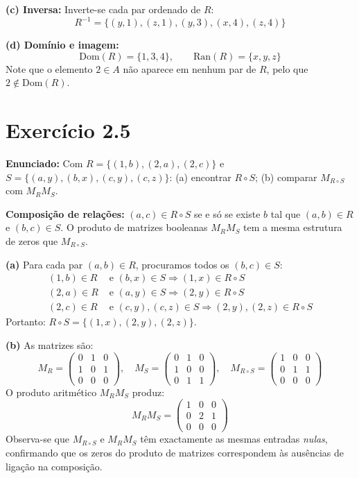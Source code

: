 \documentclass[12pt,a4paper]{article}
\begin{document}
\textbf{(c) Inversa:} Inverte-se cada par ordenado de $R$:
\[
R^{-1} = \{(y,1),(z,1),(y,3),(x,4),(z,4)\}
\]

\textbf{(d) Domínio e imagem:}
\[
\text{Dom}(R) = \{1, 3, 4\}, \qquad \text{Ran}(R) = \{x, y, z\}
\]
Note que o elemento $2 \in A$ não aparece em nenhum par de $R$, pelo que $2 \notin \text{Dom}(R)$.

\section*{Exercício 2.5}

\textbf{Enunciado:} Com $R = \{(1,b),(2,a),(2,c)\}$ e $S = \{(a,y),(b,x),(c,y),(c,z)\}$: (a) encontrar $R \circ S$; (b) comparar $M_{R \circ S}$ com $M_R M_S$.

\begin{teoribox}
\textbf{Composição de relações:} $(a,c) \in R \circ S$ se e só se existe $b$ tal que $(a,b) \in R$ e $(b,c) \in S$. O produto de matrizes booleanas $M_R M_S$ tem a mesma estrutura de zeros que $M_{R \circ S}$.
\end{teoribox}

\textbf{(a)} Para cada par $(a,b) \in R$, procuramos todos os $(b,c) \in S$:
\begin{align*}
(1,b) \in R &\text{ e } (b,x) \in S \Rightarrow (1,x) \in R \circ S \\
(2,a) \in R &\text{ e } (a,y) \in S \Rightarrow (2,y) \in R \circ S \\
(2,c) \in R &\text{ e } (c,y),(c,z) \in S \Rightarrow (2,y),(2,z) \in R \circ S
\end{align*}
Portanto: $R \circ S = \{(1,x),(2,y),(2,z)\}$.

\textbf{(b)} As matrizes são:
\[
M_R = \begin{pmatrix} 0&1&0 \\ 1&0&1 \\ 0&0&0 \end{pmatrix}, \quad
M_S = \begin{pmatrix} 0&1&0 \\ 1&0&0 \\ 0&1&1 \end{pmatrix}, \quad
M_{R \circ S} = \begin{pmatrix} 1&0&0 \\ 0&1&1 \\ 0&0&0 \end{pmatrix}
\]
O produto aritmético $M_R M_S$ produz:
\[
M_R M_S = \begin{pmatrix} 1&0&0 \\ 0&2&1 \\ 0&0&0 \end{pmatrix}
\]
Observa-se que $M_{R \circ S}$ e $M_R M_S$ têm exactamente as mesmas entradas \emph{nulas}, confirmando que os zeros do produto de matrizes correspondem às ausências de ligação na composição.
\end{document}
